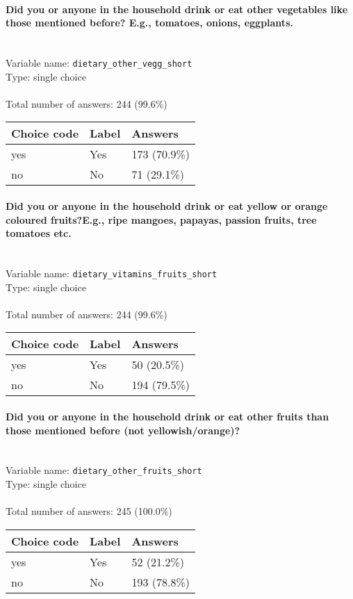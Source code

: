 \documentclass[11.5pt, a4paper]{scrartcl}
\begin{document}
\paragraph{Did you or anyone in the household drink or eat other vegetables like those mentioned before? E.g., tomatoes, onions, eggplants.}
\  \\Variable name: \texttt{dietary\_other\_vegg\_short}\\
Type: single choice\\
\\Total number of answers: 244 (99.6\%)
\\[0.2em] \begin{tabular}{p{4cm}|p{8cm}|p{3cm}}
Choice code & Label & Answers \\
\hline
yes & Yes& \cellcolor{color3}173 (70.9\%)\\
\cellcolor{mygray} no & \cellcolor{mygray}No & \cellcolor{color1}71 (29.1\%)\\
\end{tabular}
\paragraph{Did you or anyone in the household drink or eat yellow or orange coloured fruits?E.g., ripe mangoes, papayas, passion fruits, tree tomatoes etc.}
\  \\Variable name: \texttt{dietary\_vitamins\_fruits\_short}\\
Type: single choice\\
\\Total number of answers: 244 (99.6\%)
\\[0.2em] \begin{tabular}{p{4cm}|p{8cm}|p{3cm}}
Choice code & Label & Answers \\
\hline
yes & Yes& \cellcolor{color1}50 (20.5\%)\\
\cellcolor{mygray} no & \cellcolor{mygray}No & \cellcolor{color3}194 (79.5\%)\\
\end{tabular}
\paragraph{Did you or anyone in the household drink or eat other fruits than those mentioned before (not yellowish/orange)?}
\  \\Variable name: \texttt{dietary\_other\_fruits\_short}\\
Type: single choice\\
\\Total number of answers: 245 (100.0\%)
\\[0.2em] \begin{tabular}{p{4cm}|p{8cm}|p{3cm}}
Choice code & Label & Answers \\
\hline
yes & Yes& \cellcolor{color1}52 (21.2\%)\\
\cellcolor{mygray} no & \cellcolor{mygray}No & \cellcolor{color3}193 (78.8\%)\\
\end{tabular}
\end{document}
